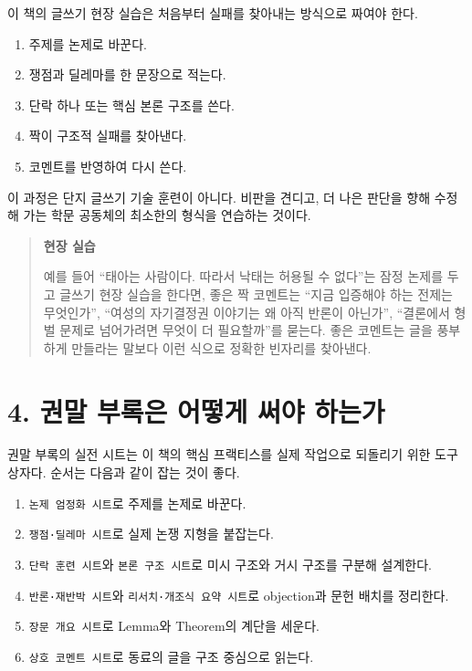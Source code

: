 이 책의 글쓰기 현장 실습은 처음부터 실패를 찾아내는 방식으로 짜여야 한다.

\begin{enumerate}
\def\labelenumi{\arabic{enumi}.}
\tightlist
\item
  주제를 논제로 바꾼다.
\item
  쟁점과 딜레마를 한 문장으로 적는다.
\item
  단락 하나 또는 핵심 본론 구조를 쓴다.
\item
  짝이 구조적 실패를 찾아낸다.
\item
  코멘트를 반영하여 다시 쓴다.
\end{enumerate}

이 과정은 단지 글쓰기 기술 훈련이 아니다. 비판을 견디고, 더 나은 판단을 향해 수정해 가는 학문 공동체의 최소한의 형식을 연습하는 것이다.

\begin{quote}
\textbf{현장 실습}

예를 들어 ``태아는 사람이다. 따라서 낙태는 허용될 수 없다''는 잠정 논제를 두고 글쓰기 현장 실습을 한다면, 좋은 짝 코멘트는 ``지금 입증해야 하는 전제는 무엇인가'', ``여성의 자기결정권 이야기는 왜 아직 반론이 아닌가'', ``결론에서 형벌 문제로 넘어가려면 무엇이 더 필요할까''를 묻는다. 좋은 코멘트는 글을 풍부하게 만들라는 말보다 이런 식으로 정확한 빈자리를 찾아낸다.
\end{quote}

\section{4. 권말 부록은 어떻게 써야 하는가}\label{4-uxad8cuxb9d0-uxbd80uxb85duxc740-uxc5b4uxb5bbuxac8c-uxc368uxc57c-uxd558uxb294uxac00}

권말 부록의 실전 시트는 이 책의 핵심 프랙티스를 실제 작업으로 되돌리기 위한 도구 상자다. 순서는 다음과 같이 잡는 것이 좋다.

\begin{enumerate}
\def\labelenumi{\arabic{enumi}.}
\tightlist
\item
  \texttt{논제\ 엄정화\ 시트}로 주제를 논제로 바꾼다.
\item
  \texttt{쟁점·딜레마\ 시트}로 실제 논쟁 지형을 붙잡는다.
\item
  \texttt{단락\ 훈련\ 시트}와 \texttt{본론\ 구조\ 시트}로 미시 구조와 거시 구조를 구분해 설계한다.
\item
  \texttt{반론·재반박\ 시트}와 \texttt{리서치·개조식\ 요약\ 시트}로 objection과 문헌 배치를 정리한다.
\item
  \texttt{장문\ 개요\ 시트}로 Lemma와 Theorem의 계단을 세운다.
\item
  \texttt{상호\ 코멘트\ 시트}로 동료의 글을 구조 중심으로 읽는다.
\end{enumerate}

